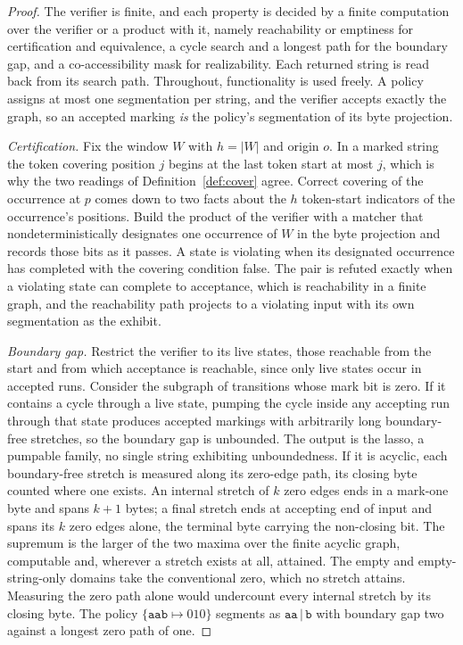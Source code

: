 \documentclass[11pt,a4paper]{article}
\theoremstyle{definition}
\theoremstyle{plain}
\newcommand{\code}[1]{\texttt{#1}}
\begin{document}
\begin{proof} The verifier is finite, and each property is decided by a finite computation
over the verifier or a product with it, namely reachability or emptiness for certification and equivalence, a cycle
search and a longest path for the boundary gap, and a co-accessibility mask for realizability. Each returned string is
read back from its search path. Throughout, functionality is used freely. A policy assigns at most one segmentation per
string, and the verifier accepts exactly the graph, so an accepted marking \emph{is} the policy's segmentation of its
byte projection.

\emph{Certification.} Fix the window $W$ with $h = |W|$ and origin $o$. In a marked string the token covering position
$j$ begins at the last token start at most $j$, which is why the two readings of Definition~\ref{def:cover} agree.
Correct covering of the occurrence at $p$ comes down to two facts about the $h$ token-start indicators of the
occurrence's positions. Build the product of the verifier with a matcher that nondeterministically designates one
occurrence of $W$ in the byte projection and records those bits as it passes. A state is violating when its designated
occurrence has completed with the covering condition false. The pair is refuted exactly when a violating state can
complete to acceptance, which is reachability in a finite graph, and the reachability path projects to a violating input
with its own segmentation as the exhibit.

\emph{Boundary gap.} Restrict the verifier to its live states, those reachable from the start and from which acceptance
is reachable, since only live states occur in accepted runs. Consider the subgraph of transitions whose mark bit is
zero. If it contains a cycle through a live state, pumping the cycle inside any accepting run through that state
produces accepted markings with arbitrarily long boundary-free stretches, so the boundary gap is unbounded. The output
is the lasso, a pumpable family, no single string exhibiting unboundedness. If it is acyclic, each boundary-free stretch
is measured along its zero-edge path, its closing byte counted where one exists. An internal stretch of $k$ zero edges
ends in a mark-one byte and spans $k+1$ bytes; a final stretch ends at accepting end of input and spans its $k$ zero
edges alone, the terminal byte carrying the non-closing bit. The supremum is the larger of the two maxima over the
finite acyclic graph, computable and, wherever a stretch exists at all, attained. The empty and empty-string-only
domains take the conventional zero, which no stretch attains. Measuring the zero path alone would undercount every
internal stretch by its closing byte. The policy $\{\code{aab} \mapsto 010\}$ segments as $\code{aa}\,|\,\code{b}$ with
boundary gap two against a longest zero path of one.


\end{proof}
\end{document}
